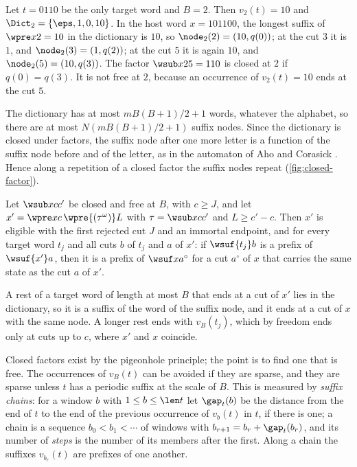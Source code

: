 \begin{example}\label{ex:nodes}
Let $t=0110$ be the only target word and $B=2$. Then $v_2(t)=10$ and
$\Dict_2=\{\eps,1,0,10\}$. In the host word $x=101100$, the longest suffix
of $\wpre x2=10$ in the dictionary is $10$, so $\node_2(2)=(10,q(0))$; at
the cut $3$ it is $1$, and $\node_2(3)=(1,q(2))$; at the cut $5$ it is again
$10$, and $\node_2(5)=(10,q(3))$. The factor $\wsub x25=110$ is closed at
$2$ if $q(0)=q(3)$. It is not free at $2$, because an occurrence of
$v_2(t)=10$ ends at the cut $5$.
\end{example}

The dictionary has at most $mB(B+1)/2+1$ words, whatever the alphabet, so
there are at most $N(mB(B+1)/2+1)$ suffix nodes. Since the dictionary is
closed under factors, the suffix node after one more letter is a function
of the suffix node before and of the letter, as in the automaton of Aho and
Corasick \cite{AhoCorasick75}. Hence along a repetition of a closed factor
the suffix nodes repeat (\cref{fig:closed-factor}).

\begin{lemma}\label{lem:pump}
Let $\wsub xc{c'}$ be closed and free at $B$, with $c\ge J$, and let
$x'=\wpre xc\,\wpre{(\tau^\omega)}L$ with $\tau=\wsub xc{c'}$ and $L\ge
c'-c$. Then $x'$ is eligible with the first rejected cut $J$ and an immortal
endpoint, and for every target word $t_j$ and all cuts $b$ of $t_j$ and $a$ of
$x'$: if $\wsuf{t_j}b$ is a prefix of $\wsuf{x'}a$, then it is a prefix of
$\wsuf x{a^\circ}$ for a cut $a^\circ$ of $x$ that carries the same state as
the cut $a$ of $x'$.
\end{lemma}



A rest of a target word of length at most $B$ that ends at a cut of $x'$ lies in
the dictionary, so it is a suffix of the word of the suffix node, and it ends
at a cut of $x$ with the same node. A longer rest ends with $v_B(t_j)$, which
by freedom ends only at cuts up to $c$, where $x'$ and $x$ coincide.

Closed factors exist by the pigeonhole principle; the point is to find one
that is free. The occurrences of $v_B(t)$ can be avoided if they are
sparse, and they are sparse unless $t$ has a periodic suffix at the scale
of $B$. This is measured by \emph{suffix chains}: for a window $b$ with
$1\le b\le\len t$ let $\gap_t(b)$ be the distance from the end of $t$ to the
end of the previous occurrence of $v_b(t)$ in $t$, if there is one; a chain
is a sequence $b_0<b_1<\cdots$ of windows with $b_{r+1}=b_r+\gap_t(b_r)$,
and its number of \emph{steps} is the number of its members after the first.
Along a chain the suffixes $v_{b_r}(t)$ are prefixes of one another.

